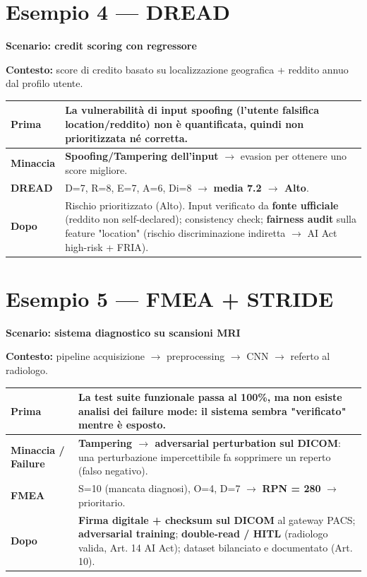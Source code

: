 \documentclass[11pt, a4paper]{article}
\begin{document}
\section*{Esempio 4 — DREAD}
\textbf{Scenario: credit scoring con regressore}

\textbf{Contesto:} score di credito basato su localizzazione geografica + reddito annuo dal profilo utente.

\noindent
\begin{tabularx}{\textwidth}{|>{\bfseries}l|X|}
\hline
Prima & La vulnerabilità di \textbf{input spoofing} (l'utente falsifica location/reddito) non è quantificata, quindi non prioritizzata né corretta. \\ \hline
Minaccia & \textbf{Spoofing/Tampering dell'input} $\rightarrow$ evasion per ottenere uno score migliore. \\ \hline
DREAD & D=7, R=8, E=7, A=6, Di=8 $\rightarrow$ \textbf{media 7.2 $\rightarrow$ Alto}. \\ \hline
Dopo & Rischio prioritizzato (Alto). Input verificato da \textbf{fonte ufficiale} (reddito non self-declared); consistency check; \textbf{fairness audit} sulla feature "location" (rischio discriminazione indiretta $\rightarrow$ AI Act high-risk + FRIA). \\ \hline
\end{tabularx}

\section*{Esempio 5 — FMEA + STRIDE}
\textbf{Scenario: sistema diagnostico su scansioni MRI}

\textbf{Contesto:} pipeline acquisizione $\rightarrow$ preprocessing $\rightarrow$ CNN $\rightarrow$ referto al radiologo.

\noindent
\begin{tabularx}{\textwidth}{|>{\bfseries}l|X|}
\hline
Prima & La test suite funzionale passa al 100\%, ma non esiste analisi dei failure mode: il sistema sembra "verificato" mentre è esposto. \\ \hline
Minaccia / Failure & \textbf{Tampering $\rightarrow$ adversarial perturbation sul DICOM}: una perturbazione impercettibile fa sopprimere un reperto (falso negativo). \\ \hline
FMEA & S=10 (mancata diagnosi), O=4, D=7 $\rightarrow$ \textbf{RPN = 280} $\rightarrow$ prioritario. \\ \hline
Dopo & \textbf{Firma digitale + checksum sul DICOM} al gateway PACS; \textbf{adversarial training}; \textbf{double-read / HITL} (radiologo valida, Art. 14 AI Act); dataset bilanciato e documentato (Art. 10). \\ \hline
\end{tabularx}
\end{document}
